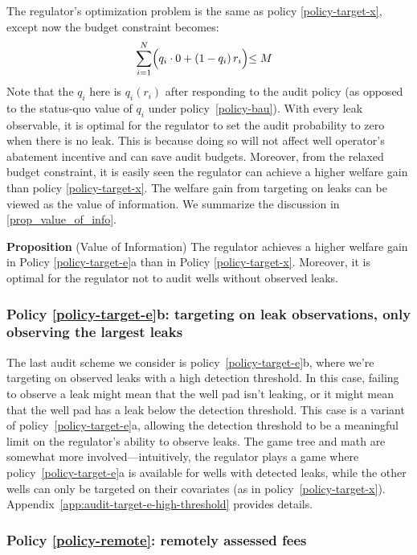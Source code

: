 \documentclass[12pt,oneside,letterpaper]{article}
\newcounter{propositioncounter}
\newlength{\premathenv}
\newlength{\withinmathenv}
\newlength{\postmathenv}
\theoremstyle{definition}
\newenvironment{proposition}[1]{%
\vspace{\premathenv}%
\refstepcounter{propositioncounter}%
\noindent\textbf{Proposition \thepropositioncounter}
{#1}
\vspace{\withinmathenv}
}{%
\vspace{\postmathenv}%
}
\begin{document}
\begin{refsection}
The regulator's optimization problem is the same as policy \ref{policy-target-x}, except now the budget constraint becomes:
\begin{align*}
&\sum^{N}_{i=1} \Bigl( q_i \cdot 0 + (1 - q_i)\, r_i \Bigl) \leq M
\end{align*}
Note that the \(q_i\) here is \(q_i(r_i)\) after responding to the audit policy (as opposed to the status-quo value of \(q_i\) under policy~\ref{policy-bau}).
With every leak observable, it is optimal for the regulator to set the audit probability to zero when there is no leak.
This is because doing so will not affect well operator's abatement incentive and can save audit budgets.
Moreover, from the relaxed budget constraint, it is easily seen the regulator can achieve a higher welfare gain than policy \ref{policy-target-x}.
The welfare gain from targeting on leaks can be viewed as the value of information.
We summarize the discussion in \autoref{prop_value_of_info}.

\begin{proposition}{(Value of Information)} \label{prop_value_of_info}
    The regulator achieves a higher welfare gain in Policy \ref{policy-target-e}a than in Policy \ref{policy-target-x}.
    Moreover, it is optimal for the regulator not to audit wells without observed leaks.
\end{proposition}

\subsubsection{Policy \ref{policy-target-e}b: targeting on leak observations, only observing the largest leaks}

The last audit scheme we consider is policy~\ref{policy-target-e}b, where we're targeting on observed leaks with a high detection threshold.
In this case, failing to observe a leak might mean that the well pad isn't leaking, or it might mean that the well pad has a leak below the detection threshold.
This case is a variant of policy~\ref{policy-target-e}a, allowing the detection threshold to be a meaningful limit on the regulator's ability to observe leaks.
The game tree and math are somewhat more involved---intuitively, the regulator plays a game where policy~\ref{policy-target-e}a is available for wells with detected leaks, while the other wells can only be targeted on their covariates (as in policy~\ref{policy-target-x}).
Appendix~\ref{app:audit-target-e-high-threshold} provides details.


\subsubsection{Policy \ref{policy-remote}: remotely assessed fees}
\label{sec:remotely-assessed-fees}


\end{refsection}
\end{document}
